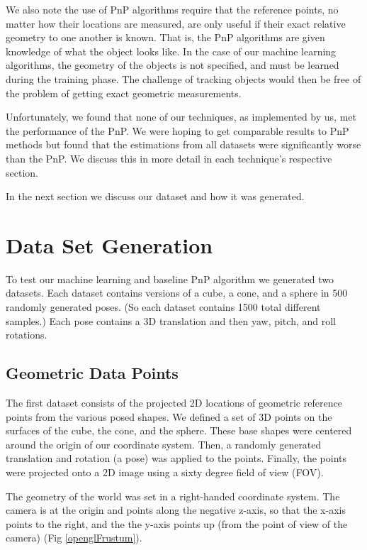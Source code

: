 \documentclass[journal]{IEEEtran}
\begin{document}
 We also note the use of PnP algorithms require that the reference points, no matter how their locations are measured, are only useful if their exact relative geometry to one another is known. That is, the PnP algorithms are given knowledge of what the object looks like. In the case of our machine learning algorithms, the geometry of the objects is not specified, and must be learned during the training phase. The challenge of tracking objects would then be free of the problem of getting exact geometric measurements.
 
Unfortunately, we found that none of our techniques, as implemented by us, met the performance of the PnP.  We were hoping to get comparable results to PnP methods but found that the estimations from all datasets were significantly worse than the PnP. We discuss this in more detail in each technique's respective section.

In the next section we discuss our dataset and how it was generated. 


\section{Data Set Generation}

To test our machine learning and baseline PnP algorithm we generated two datasets. Each dataset contains versions of a cube, a cone, and a sphere in 500 randomly generated poses. (So each dataset contains 1500 total different samples.) Each pose contains a 3D translation and then yaw, pitch, and roll rotations.

\subsection{Geometric Data Points}

The first dataset consists of the projected 2D locations of geometric reference points from the various posed shapes. We defined a set of 3D points on the surfaces of the cube, the cone, and the sphere. These base shapes were centered around the origin of our coordinate system. Then, a randomly generated translation and rotation (a pose) was applied to the points. Finally, the points were projected onto a 2D image using a sixty degree field of view (FOV).

The geometry of the world was set in a right-handed coordinate system. The camera is at the origin and points along the negative z-axis, so that the x-axis points to the right, and the the y-axis points up (from the point of view of the camera) (Fig \ref{openglFrustum}).
\end{document}
